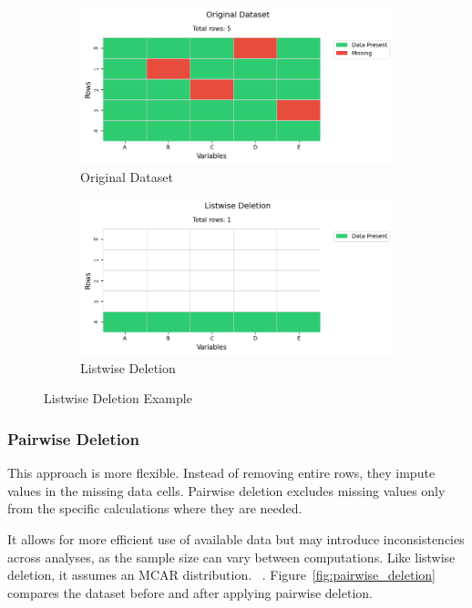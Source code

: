\documentclass[a4paper,12pt]{article}
\begin{document}
\begin{figure}[H]
\centering
\begin{subfigure}{0.48\textwidth}
\includegraphics[width=\linewidth]{original_dataset.png}
\caption{Original Dataset}
\end{subfigure}
\hfill
\begin{subfigure}{0.48\textwidth}
\includegraphics[width=\linewidth]{listwise_deletion.png}
\caption{Listwise Deletion}
\end{subfigure}
\caption{Listwise Deletion Example}
\label{fig:listwise_deletion}
\end{figure}


\subsubsection{Pairwise Deletion}

This approach is more flexible. Instead of removing entire rows, they impute values in the missing data cells. Pairwise deletion excludes missing values only from the specific calculations where they are needed.

It allows for more efficient use of available data but may introduce inconsistencies across analyses, as the sample size can vary between computations. Like listwise deletion, it assumes an MCAR distribution. ~\cite{3}. Figure~\ref{fig:pairwise_deletion} compares the dataset before and after applying pairwise deletion.
\end{document}
